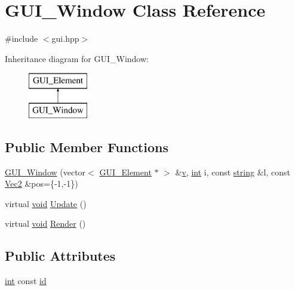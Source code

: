 \hypertarget{class_g_u_i___window}{\section{G\-U\-I\-\_\-\-Window Class Reference}
\label{class_g_u_i___window}
}


{\ttfamily \#include $<$gui.\-hpp$>$}

Inheritance diagram for G\-U\-I\-\_\-\-Window\-:\begin{figure}[H]
\begin{center}
\leavevmode
\includegraphics[height=2.000000cm]{class_g_u_i___window}
\end{center}
\end{figure}
\subsection*{Public Member Functions}
\begin{DoxyCompactItemize}
\item 
\hyperlink{class_g_u_i___window_a08ce7227b3bab8d4ae1192286694aab1}{G\-U\-I\-\_\-\-Window} (vector$<$ \hyperlink{class_g_u_i___element}{G\-U\-I\-\_\-\-Element} $\ast$ $>$ \&\hyperlink{_s_d_l__opengl_8h_a10a82eabcb59d2fcd74acee063775f90}{v}, \hyperlink{_s_d_l__thread_8h_a6a64f9be4433e4de6e2f2f548cf3c08e}{int} i, const \hyperlink{_s_d_l__opengl__glext_8h_ae84541b4f3d8e1ea24ec0f466a8c568b}{string} \&l, const \hyperlink{class_vec2}{Vec2} \&pos=\{-\/1,-\/1\})
\item 
virtual \hyperlink{_s_d_l__opengles2__gl2ext_8h_ae5d8fa23ad07c48bb609509eae494c95}{void} \hyperlink{class_g_u_i___window_a12a4b05b11771a93ff7da263a52a51d7}{Update} ()
\item 
virtual \hyperlink{_s_d_l__opengles2__gl2ext_8h_ae5d8fa23ad07c48bb609509eae494c95}{void} \hyperlink{class_g_u_i___window_aac703a5538d045a5ce555d8389a2dc32}{Render} ()
\end{DoxyCompactItemize}
\subsection*{Public Attributes}
\begin{DoxyCompactItemize}
\item 
\hyperlink{_s_d_l__thread_8h_a6a64f9be4433e4de6e2f2f548cf3c08e}{int} const \hyperlink{class_g_u_i___window_ae119bbcc132008e2d5030ba0b9f9b950}{id}
\end{DoxyCompactItemize}
